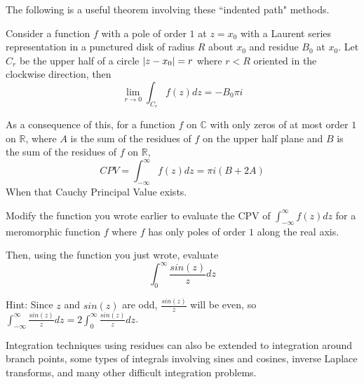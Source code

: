 The following is a useful theorem involving these ``indented path" methods.
\begin{theorem}
Consider a function $f$ with a pole of order $1$ at $z=x_0$ with a Laurent series representation in a punctured disk of radius $R$ about $x_0$ and residue $B_0$ at $x_0$.
Let $C_r$ be the upper half of a circle $\left\lvert z-x_0\right\rvert=r$ where $r<R$ oriented in the clockwise direction, then
$$\lim_{r\to 0} \int_{C_r} f(z) dz = - B_0 \pi i$$
\end{theorem}
As a consequence of this, for a function $f$ on $\mathbb{C}$ with only zeros of at most order $1$ on $\mathbb{R}$, where $A$ is the sum of the residues of $f$ on the upper half plane and $B$ is the sum of the residues of $f$ on $\mathbb{R}$, 
$$CPV = \int_{-\infty}^{\infty} f(z) dz = \pi i (B+2A)$$ 
When that Cauchy Principal Value exists.

\begin{problem}
Modify the function you wrote earlier to evaluate the CPV of $\int_{-\infty}^{\infty} f(z) dz$ for a meromorphic function $f$ where $f$ has only poles of order $1$ along the real axis.

Then, using the function you just wrote, evaluate
$$\int_{0}^{\infty} \frac{sin(z)}{z} dz$$

Hint: Since $z$ and $sin(z)$ are odd, $\frac{sin(z)}{z}$ will be even, so 
$\int_{-\infty}^{\infty} \frac{sin(z)}{z} dz = 2 \int_{0}^{\infty} \frac{sin(z)}{z} dz$.
\end{problem}


Integration techniques using residues can also be extended to integration around branch points, some types of integrals involving sines and cosines, inverse Laplace transforms, and many other difficult integration problems.
